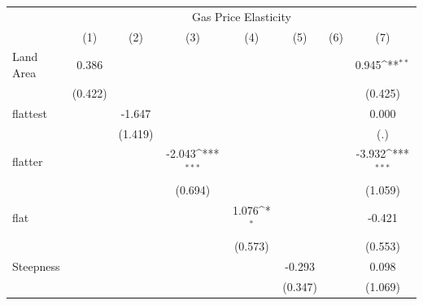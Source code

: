 {
\def\sym#1{\ifmmode^{#1}\else\(^{#1}\)\fi}
\begin{tabular}{l*{7}{c}}
\hline\hline
            &\multicolumn{7}{c}{Gas Price Elasticity}                                                                                                                 \\
            &\multicolumn{1}{c}{(1)}         &\multicolumn{1}{c}{(2)}         &\multicolumn{1}{c}{(3)}         &\multicolumn{1}{c}{(4)}         &\multicolumn{1}{c}{(5)}         &\multicolumn{1}{c}{(6)}         &\multicolumn{1}{c}{(7)}         \\
\hline
Land Area   &       0.386         &                     &                     &                     &                     &                     &       0.945\sym{**} \\
            &     (0.422)         &                     &                     &                     &                     &                     &     (0.425)         \\
[1em]
flattest    &                     &      -1.647         &                     &                     &                     &                     &       0.000         \\
            &                     &     (1.419)         &                     &                     &                     &                     &         (.)         \\
[1em]
flatter     &                     &                     &      -2.043\sym{***}&                     &                     &                     &      -3.932\sym{***}\\
            &                     &                     &     (0.694)         &                     &                     &                     &     (1.059)         \\
[1em]
flat        &                     &                     &                     &       1.076\sym{*}  &                     &                     &      -0.421         \\
            &                     &                     &                     &     (0.573)         &                     &                     &     (0.553)         \\
[1em]
Steepness   &                     &                     &                     &                     &      -0.293         &                     &       0.098         \\
            &                     &                     &                     &                     &     (0.347)         &                     &     (1.069)         \\

\end{tabular}}
